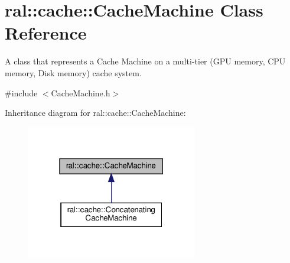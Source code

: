 \hypertarget{classral_1_1cache_1_1CacheMachine}{}\section{ral\+:\+:cache\+:\+:Cache\+Machine Class Reference}
\label{classral_1_1cache_1_1CacheMachine}


A class that represents a Cache Machine on a multi-\/tier (G\+PU memory, C\+PU memory, Disk memory) cache system.  




{\ttfamily \#include $<$Cache\+Machine.\+h$>$}



Inheritance diagram for ral\+:\+:cache\+:\+:Cache\+Machine\+:\nopagebreak
\begin{figure}[H]
\begin{center}
\leavevmode
\includegraphics[width=211pt]{classral_1_1cache_1_1CacheMachine__inherit__graph}
\end{center}
\end{figure}
